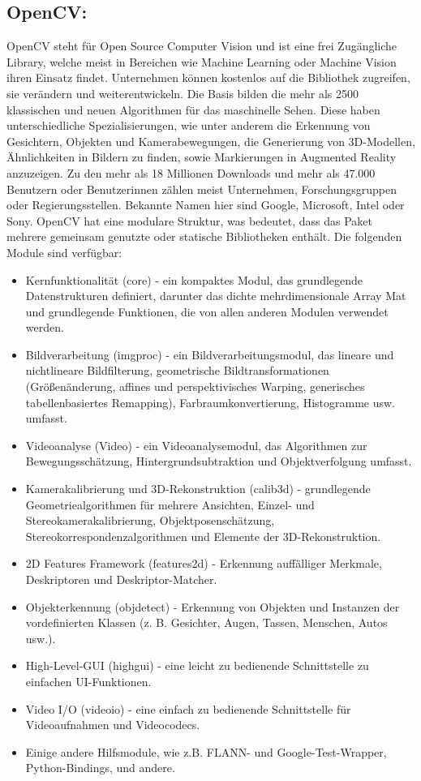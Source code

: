 \subsection{OpenCV: } OpenCV steht für Open Source Computer Vision und ist eine frei Zugängliche Library, welche meist in Bereichen wie Machine Learning oder Machine Vision ihren Einsatz findet. Unternehmen können kostenlos auf die Bibliothek zugreifen, sie verändern und weiterentwickeln. Die Basis bilden die mehr als 2500 klassischen und neuen Algorithmen für das maschinelle Sehen. Diese haben unterschiedliche Spezialisierungen, wie unter anderem die Erkennung von Gesichtern, Objekten und Kamerabewegungen, die Generierung von 3D-Modellen, Ähnlichkeiten in Bildern zu finden, sowie Markierungen in Augmented Reality anzuzeigen. Zu den mehr als 18 Millionen Downloads und mehr als 47.000 Benutzern oder Benutzerinnen zählen meist Unternehmen, Forschungsgruppen oder Regierungsstellen. Bekannte Namen hier sind Google, Microsoft, Intel oder Sony.\cite{AboutOpenCV}
OpenCV hat eine modulare Struktur, was bedeutet, dass das Paket mehrere gemeinsam genutzte oder statische Bibliotheken enthält. Die folgenden Module sind verfügbar:
\begin{itemize}
    \item Kernfunktionalität (core) - ein kompaktes Modul, das grundlegende Datenstrukturen definiert, darunter das dichte mehrdimensionale Array Mat und grundlegende Funktionen, die von allen anderen Modulen verwendet werden.
    \item Bildverarbeitung (imgproc) - ein Bildverarbeitungsmodul, das lineare und nichtlineare Bildfilterung, geometrische Bildtransformationen (Größenänderung, affines und perspektivisches Warping, generisches tabellenbasiertes Remapping), Farbraumkonvertierung, Histogramme usw. umfasst.
    \item Videoanalyse (Video) - ein Videoanalysemodul, das Algorithmen zur Bewegungsschätzung, Hintergrundsubtraktion und Objektverfolgung umfasst.
    \item Kamerakalibrierung und 3D-Rekonstruktion (calib3d) - grundlegende Geometriealgorithmen für mehrere Ansichten, Einzel- und Stereokamerakalibrierung, Objektposenschätzung, Stereokorrespondenzalgorithmen und Elemente der 3D-Rekonstruktion.
    \item 2D Features Framework (features2d) - Erkennung auffälliger Merkmale, Deskriptoren und Deskriptor-Matcher.
    \item Objekterkennung (objdetect) - Erkennung von Objekten und Instanzen der vordefinierten Klassen (z. B. Gesichter, Augen, Tassen, Menschen, Autos usw.).
    \item High-Level-GUI (highgui) - eine leicht zu bedienende Schnittstelle zu einfachen UI-Funktionen.
    \item Video I/O (videoio) - eine einfach zu bedienende Schnittstelle für Videoaufnahmen und Videocodecs.
    \item Einige andere Hilfsmodule, wie z.B. FLANN- und Google-Test-Wrapper, Python-Bindings, und andere.
\end{itemize}
